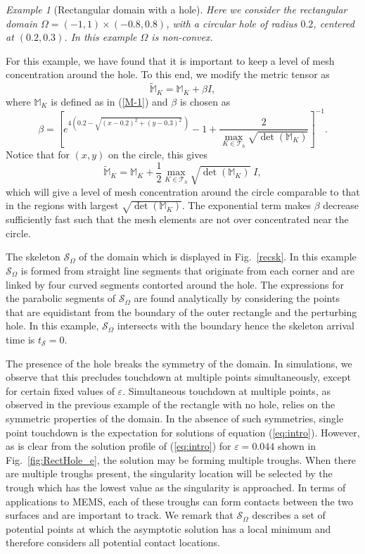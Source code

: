 \documentclass{siamart0516}
\renewcommand{\eqref}[1]{(\ref{#1})}
\def \M{\mathbb{M}}
\newcommand{\eps}{\varepsilon}
\newcommand{\skel}{\mathcal{S}_{\Omega}}
\newcommand{\sat}{t_{\mathcal{S}}}
\theoremstyle{plain}%
\theoremstyle{definition}
\theoremstyle{remark}
\newtheorem{exam}{\hspace{1mm}Example}[section]
\begin{document}
\vspace{10pt}

 \begin{exam}[Rectangular domain with a hole]
{\em Here we consider the rectangular domain $\Omega = (-1,1)\times (-0.8,0.8)$, with a circular hole of radius $0.2$, centered at $(0.2,0.3)$. In this example $\Omega$ is non-convex.}
\label{examrec}
\end{exam}

For this example, we have found that it is important to keep a level of mesh concentration
around the hole. To this end, we modify the metric tensor as 
\begin{equation} 
\tilde{\M}_K = \M_K + \beta I,
\label{M-2}
\end{equation}
where $\M_K$ is defined as in (\ref{M-1}) and $\beta$ is chosen as 
\[
\beta =  \left [ e^{4(0.2-\sqrt{(x - 0.2)^2 +(y-0.3)^2}\,)} - 1
+ \frac{2}{\max\limits_{K \in \mathcal{T}_h} \sqrt{\det(\M_K)} } \right ]^{-1}.
\]  
Notice that for $(x,y)$ on the circle, this gives
\[ 
\tilde{\M}_K = \M_K + \frac{1}{2} \max_{K \in \mathcal{T}_h}\sqrt{\det(\M_K)}\; I,
\]
which will give a level of mesh concentration around the circle comparable to that in the regions
with largest $\sqrt{\det(\M_K)}$. The exponential term makes $\beta$ decrease sufficiently fast such that
the mesh elements are not over concentrated near the circle.


The skeleton $\skel$ of the domain which is displayed in Fig.~\ref{recsk}. In this example $\skel$ is formed from straight line segments that originate from each corner and are linked by four curved segments contorted around the hole. The expressions for the parabolic segments of $\skel$ are found analytically by considering the points that are equidistant from the boundary of the outer rectangle and the perturbing hole. In this example, $\skel$ intersects with the boundary hence the skeleton arrival time is $\sat=0$.

The presence of the hole breaks the symmetry of the domain. In simulations, we observe that this precludes touchdown at multiple points simultaneously, except for certain fixed values of $\eps$. Simultaneous touchdown at multiple points, as observed in the previous example of the rectangle with no hole, relies on the symmetric properties of the domain. In the absence of such symmetries, single point touchdown is the expectation for solutions of equation \eqref{eq:intro}. However, as is clear from the solution profile of \eqref{eq:intro} for $\eps=0.044$ shown in Fig.~\ref{fig:RectHole_e}, the solution may be forming multiple troughs.  When there are multiple troughs present, the singularity location will be selected by the trough which has the lowest value as the singularity is approached.  In terms of applications to MEMS, each of these troughs can form contacts between the two surfaces and are important to track. We remark that $\skel$ describes a set of potential points at which the asymptotic solution has a local minimum and therefore considers all potential contact locations.
\end{document}
